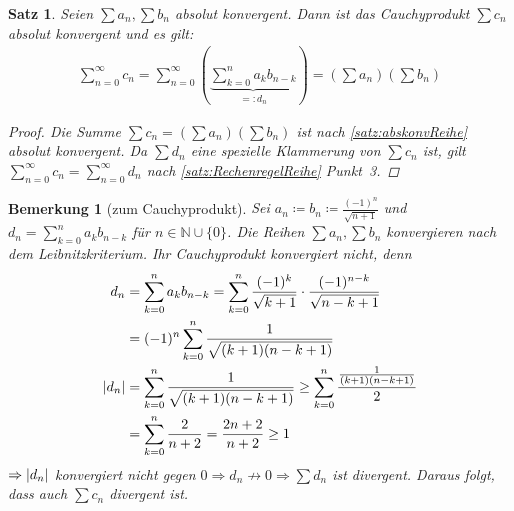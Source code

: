 \documentclass[ngerman,titlepage,twoside, parskip=half*]{scrreprt}
\newcommand*{\N}{\mathbb{N}}
\theoremstyle{break}
\newtheorem{theorem}{Satz}[section]
\theoremstyle{nonumberbreak}
\newtheorem{remark}{Bemerkung}
\newtheorem{proof}{Beweis:}
\DeclarePairedDelimiter{\abs}{\lvert}{\rvert}
\begin{document}
\begin{theorem}
  Seien $\sum a_n, \sum b_n$ absolut konvergent. Dann ist das Cauchyprodukt
  $\sum c_n$ absolut konvergent und es gilt:
  \begin{gather*}
    \sum_{n=0}^\infty c_n = \sum_{n=0}^\infty \left(\underbrace{\sum_{k=0}^n
       a_k b_{n-k}}_{=\colon d_n}\right) = \left(\sum a_n\right)\left(\sum
       b_n\right)
  \end{gather*}
  \begin{proof}
    Die Summe $\sum c_n=(\sum a_n)(\sum b_n)$ ist nach
    \autoref{satz:abskonvReihe} absolut konvergent. Da $\sum d_n$ eine
    spezielle Klammerung von $\sum c_n$ ist, gilt $\sum_{n=0}^\infty c_n=
    \sum_{n=0}^\infty d_n$ nach \autoref{satz:RechenregelReihe} Punkt~3.
  \end{proof}
\end{theorem}

\begin{remark}[zum Cauchyprodukt]
  Sei $a_n\coloneqq b_n\coloneqq\frac{(-1)^n}{\sqrt{n+1}}$ und
  $d_n=\sum_{k=0}^n a_kb_{n-k}$ für $n\in \N\cup \{0\}$. Die Reihen $\sum a_n,
  \sum b_n$ konvergieren nach dem Leibnitzkriterium. Ihr Cauchyprodukt
  konvergiert nicht, denn
\begin{align*}
  d_n &= \sum_{k=0}^n a_k b_{n-k}= \sum_{k=0}^n \frac{(-1)^k}{\sqrt{k+1}}\cdot
     \frac{(-1)^{n-k}}{\sqrt{n-k+1}}\\
  &= (-1)^n \sum_{k=0}^n \frac{1}{\sqrt{(k+1)(n-k+1)}}\\
  \abs{d_n} &= \sum_{k=0}^n \frac{1}{\sqrt{(k+1)(n-k+1)}} \geq \sum_{k=0}^n
     \frac{\frac{1}{(k+1)(n-k+1)}}{2}\\
  &= \sum_{k=0}^n \frac{2}{n+2}= \frac{2n+2}{n+2}\geq 1
\end{align*}
$\Rightarrow \abs{d_n}$ konvergiert nicht gegen $0\Rightarrow d_n \not\rightarrow 0\Rightarrow \sum d_n$ ist divergent. Daraus
folgt, dass auch $\sum c_n$ divergent ist.
\end{remark}
\end{document}
